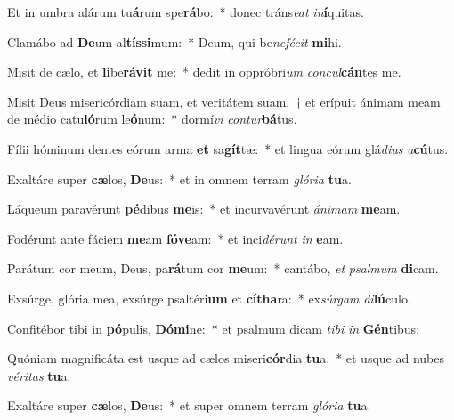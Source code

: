 \item Et in umbra alárum tu\textbf{á}rum spe\textbf{rá}bo:~* donec tráns\textit{e}\textit{at} \textit{in}\textbf{í}quitas.
\item Clamábo ad \textbf{De}um al\textbf{tís}\textbf{si}mum:~* Deum, qui be\textit{ne}\textit{fé}\textit{cit} \textbf{mi}hi.
\item Misit de cælo, et \textbf{li}be\textbf{rá}\textbf{vit} me:~* dedit in oppróbri\textit{um} \textit{con}\textit{cul}\textbf{cán}tes me.
\item Misit Deus misericórdiam suam, et veritátem suam,~† et erípuit ánimam meam de médio catu\textbf{ló}rum le\textbf{ó}num:~* dormí\textit{vi} \textit{con}\textit{tur}\textbf{bá}tus.
\item Fílii hóminum dentes eórum arma \textbf{et} sa\textbf{gít}tæ:~* et lingua eórum glá\textit{di}\textit{us} \textit{a}\textbf{cú}tus.
\item Exaltáre super \textbf{cæ}los, \textbf{De}us:~* et in omnem terram \textit{gló}\textit{ri}\textit{a} \textbf{tu}a.
\item Láqueum paravérunt \textbf{pé}dibus \textbf{me}is:~* et incurvavérunt \textit{á}\textit{ni}\textit{mam} \textbf{me}am.
\item Fodérunt ante fáciem \textbf{me}am \textbf{fó}\textbf{ve}am:~* et inci\textit{dé}\textit{runt} \textit{in} \textbf{e}am.
\item Parátum cor meum, Deus, pa\textbf{rá}tum cor \textbf{me}um:~* cantábo, \textit{et} \textit{psal}\textit{mum} \textbf{di}cam.
\item Exsúrge, glória mea, exsúrge psaltéri\textbf{um} et \textbf{cí}\textbf{tha}ra:~* ex\textit{súr}\textit{gam} \textit{di}\textbf{lú}culo.
\item Confitébor tibi in \textbf{pó}pulis, \textbf{Dó}\textbf{mi}ne:~* et psalmum dicam \textit{ti}\textit{bi} \textit{in} \textbf{Gén}tibus:
\item Quóniam magnificáta est usque ad cælos miseri\textbf{cór}dia \textbf{tu}a,~* et usque ad nubes \textit{vé}\textit{ri}\textit{tas} \textbf{tu}a.
\item Exaltáre super \textbf{cæ}los, \textbf{De}us:~* et super omnem terram \textit{gló}\textit{ri}\textit{a} \textbf{tu}a.
